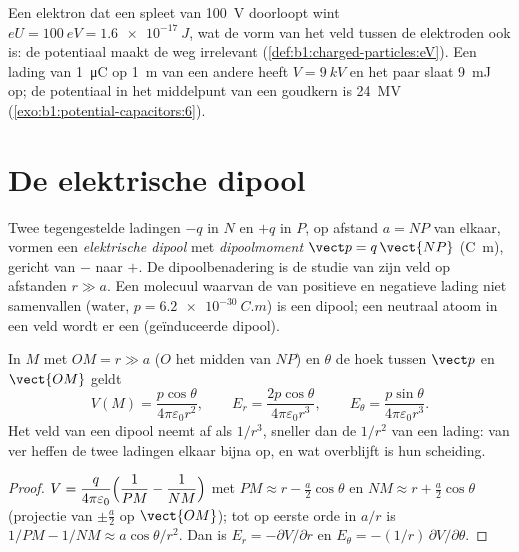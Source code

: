 \begin{example}\label{ex:b1:potential-capacitors:eV}
Een elektron dat een spleet van \qty{100}{V} doorloopt wint $eU = \qty{100}{eV} =
\qty{1.6e-17}{J}$, wat de vorm van het veld tussen de
elektroden ook is: de potentiaal maakt de weg irrelevant
(\cref{def:b1:charged-particles:eV}). Een lading van \qty{1}{\micro C} op
\qty{1}{m} van een andere heeft $V = \qty{9}{kV}$ en het paar slaat
\qty{9}{mJ} op; de potentiaal in het middelpunt van een goudkern is
\qty{24}{MV} (\cref{exo:b1:potential-capacitors:6}).
\end{example}

\section{De elektrische dipool}

\begin{definition}\label{def:b1:potential-capacitors:dipole}
Twee tegengestelde ladingen $-q$ in $N$ en $+q$ in $P$, op afstand $a = NP$
van elkaar, vormen een \emph{elektrische dipool} met \emph{dipoolmoment}
$\vect p = q\,\vect{NP}$ (\unit{C.m}), gericht van $-$ naar $+$. De
dipoolbenadering is de studie van zijn veld op afstanden $r \gg a$. Een
molecuul waarvan de  van positieve en negatieve lading niet samenvallen
(water, $p = \qty{6.2e-30}{C.m}$) is een dipool; een neutraal atoom in een veld
wordt er een (geïnduceerde dipool).
\end{definition}

\begin{proposition}\label{prop:b1:potential-capacitors:dipolefield}
In $M$ met $OM = r \gg a$ ($O$ het midden van $NP$) en $\theta$ de
hoek tussen $\vect p$ en $\vect{OM}$ geldt
\[
V(M) = \frac{p\cos\theta}{4\pi\varepsilon_0 r^2}, \qquad
E_r = \frac{2p\cos\theta}{4\pi\varepsilon_0r^3}, \qquad
E_\theta = \frac{p\sin\theta}{4\pi\varepsilon_0r^3} .
\]
Het veld van een dipool neemt af als $1/r^3$, sneller dan de $1/r^2$ van
een lading: van ver heffen de twee ladingen elkaar bijna op, en wat overblijft
is hun scheiding.
\end{proposition}

\begin{proof}
$V = \dfrac{q}{4\pi\varepsilon_0}\Bigl(\dfrac1{PM} - \dfrac1{NM}\Bigr)$ met
$PM \approx r - \tfrac a2\cos\theta$ en $NM \approx r + \tfrac a2\cos\theta$
(projectie van $\pm\tfrac a2$ op $\vect{OM}$); tot op eerste orde in $a/r$ is
$1/PM - 1/NM \approx a\cos\theta/r^2$. Dan is $E_r = -\partial V/\partial r$ en
$E_\theta = -(1/r)\,\partial V/\partial\theta$.
\end{proof}

